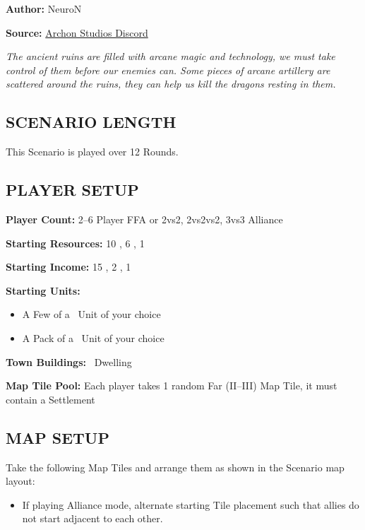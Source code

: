 
\begin{multicols}{2}

\textbf{Author:} NeuroN

\textbf{Source:} \href{https://discord.com/channels/740870068178649108/1279029213839626313}{Archon Studios Discord}

\textit{The ancient ruins are filled with arcane magic and technology, we must take control of them before our enemies can.
Some pieces of arcane artillery are scattered around the ruins, they can help us kill the dragons resting in them.}

\subsection*{\MakeUppercase{Scenario Length}}
This Scenario is played over 12 Rounds.

\subsection*{\MakeUppercase{Player Setup}}
\textbf{Player Count:} 2--6 Player FFA or 2vs2, 2vs2vs2, 3vs3 Alliance

\textbf{Starting Resources:} 10 , 6 , 1 

\textbf{Starting Income:} 15 , 2 , 1 

\textbf{Starting Units:}
\begin{itemize}
  \item A Few of a \bronze\ Unit of your choice
  \item A Pack of a \bronze\ Unit of your choice
\end{itemize}

\textbf{Town Buildings:} \bronze\ Dwelling

\textbf{Map Tile Pool:} Each player takes 1 random Far (II--III) Map Tile, it must contain a Settlement

\subsection*{\MakeUppercase{Map Setup}}
Take the following Map Tiles and arrange them as shown in the Scenario map layout:

\begin{itemize}
  \item If playing Alliance mode, alternate starting Tile placement such that allies do not start adjacent to each other.
\end{itemize}


\end{multicols}
